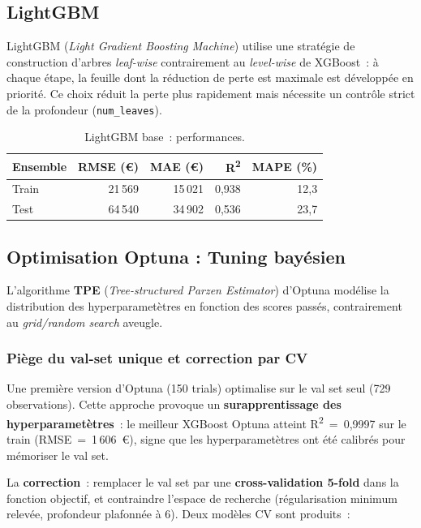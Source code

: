 \documentclass[12pt,a4paper]{article}
\begin{document}
\subsection{LightGBM}

LightGBM (\textit{Light Gradient Boosting Machine}) utilise une strat\'egie de construction d'arbres \textit{leaf-wise} contrairement au \textit{level-wise} de XGBoost~: \`a chaque \'etape, la feuille dont la r\'eduction de perte est maximale est d\'evelopp\'ee en priorit\'e. Ce choix r\'eduit la perte plus rapidement mais n\'ecessite un contr\^ole strict de la profondeur (\texttt{num\_leaves}).

\begin{table}[H]
\centering
\caption{LightGBM base~: performances.}
\label{tab:lgb}
\begin{tabular}{lrrrr}
\toprule
\textbf{Ensemble} & \textbf{RMSE (\euro)} & \textbf{MAE (\euro)} & \textbf{R\textsuperscript{2}} & \textbf{MAPE (\%)} \\
\midrule
Train & 21\,569 & 15\,021 & 0{,}938 & 12{,}3 \\
Test  & 64\,540 & 34\,902 & 0{,}536 & 23{,}7 \\
\bottomrule
\end{tabular}
\end{table}

\subsection{Optimisation Optuna : Tuning bay\'esien}

L'algorithme \textbf{TPE} (\textit{Tree-structured Parzen Estimator}) d'Optuna mod\'elise la distribution des hyperparamet\`etres en fonction des scores pass\'es, contrairement au \textit{grid/random search} aveugle.

\subsubsection{Pi\`ege du val-set unique et correction par CV}

Une premi\`ere version d'Optuna (150 trials) optimalise sur le val set seul (729 observations). Cette approche provoque un \textbf{surapprentissage des hyperparamet\`etres}~: le meilleur XGBoost Optuna atteint R\textsuperscript{2}~=~0{,}9997 sur le train (RMSE~=~1\,606~\euro), signe que les hyperparamet\`etres ont \'et\'e calibr\'es pour m\'emoriser le val set.

La \textbf{correction}~: remplacer le val set par une \textbf{cross-validation 5-fold} dans la fonction objectif, et contraindre l'espace de recherche (r\'egularisation minimum relev\'ee, profondeur plafonn\'ee \`a 6). Deux mod\`eles CV sont produits~:
\end{document}
